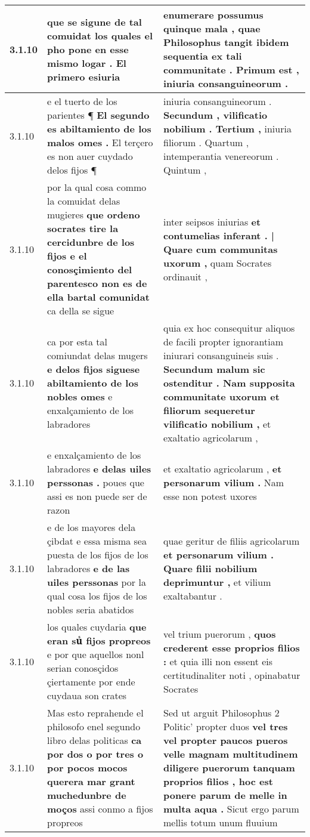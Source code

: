 \begin{tabular}{|p{1cm}|p{6.5cm}|p{6.5cm}|}
3.1.10 & que se sigune de tal comuidat \textbf{ los quales el pho pone en esse mismo logar . } El primero esiuria & enumerare possumus quinque mala , \textbf{ quae Philosophus tangit ibidem sequentia ex tali communitate . Primum est , } iniuria consanguineorum . \\\hline
3.1.10 & e el tuerto de los parientes ¶ \textbf{ El segundo es abiltamiento de los malos omes . } El terçero es non auer cuydado delos fijos ¶ & iniuria consanguineorum . \textbf{ Secundum , vilificatio nobilium . Tertium , } iniuria filiorum . Quartum , intemperantia venereorum . Quintum , \\\hline
3.1.10 & por la qual cosa commo la comuidat delas mugieres \textbf{ que ordeno socrates tire la cercidunbre de los fijos e el conosçimiento del parentesco non es de ella bartal comunidat } ca della se sigue & inter seipsos iniurias \textbf{ et contumelias inferant . | Quare cum communitas uxorum , } quam Socrates ordinauit , \\\hline
3.1.10 & ca por esta tal comiundat delas mugers \textbf{ e delos fijos siguese abiltamiento de los nobles omes } e enxalçamiento de los labradores & quia ex hoc consequitur aliquos de facili propter ignorantiam iniurari consanguineis suis . \textbf{ Secundum malum sic ostenditur . Nam supposita communitate uxorum et filiorum sequeretur vilificatio nobilium , } et exaltatio agricolarum , \\\hline
3.1.10 & e enxalçamiento de los labradores \textbf{ e delas uiles perssonas . } poues que assi es non puede ser de razon & et exaltatio agricolarum , \textbf{ et personarum vilium . } Nam esse non potest uxores \\\hline
3.1.10 & e de los mayores dela çibdat e essa misma sea puesta de los fijos de los labradores \textbf{ e de las uiles perssonas } por la qual cosa los fijos de los nobles seria abatidos & quae geritur de filiis agricolarum \textbf{ et personarum vilium . Quare filii nobilium deprimuntur , } et vilium exaltabantur . \\\hline
3.1.10 & los quales cuydaria \textbf{ que eran suᷤ fijos propreos } e por que aquellos nonl serian conosçidos çiertamente por ende cuydaua son crates & vel trium puerorum , \textbf{ quos crederent esse proprios filios : } et quia illi non essent eis certitudinaliter noti , opinabatur Socrates \\\hline
3.1.10 & Mas esto reprahende el philosofo enel segundo libro delas politicas \textbf{ ca por dos o por tres o por pocos mocos querera mar grant muchedunbre de moços } assi conmo a fijos propreos & Sed ut arguit Philosophus 2 Politic’ propter duos \textbf{ vel tres vel propter paucos pueros velle magnam multitudinem diligere puerorum tanquam proprios filios , hoc est ponere parum de melle in multa aqua . } Sicut ergo parum mellis totum unum fluuium \\\hline

\end{tabular}
